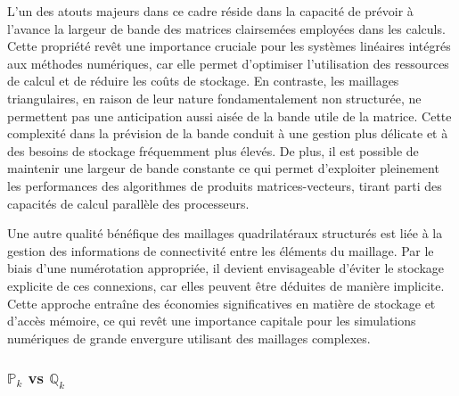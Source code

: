 L'un des atouts majeurs dans ce cadre réside dans la capacité de prévoir à l'avance la largeur de bande des matrices clairsemées employées dans les calculs. Cette propriété revêt une importance cruciale pour les systèmes linéaires intégrés aux méthodes numériques, car elle permet d'optimiser l'utilisation des ressources de calcul et de réduire les coûts de stockage. En contraste, les maillages triangulaires, en raison de leur nature fondamentalement non structurée, ne permettent pas une anticipation aussi aisée de la bande utile de la matrice. Cette complexité dans la prévision de la bande conduit à une gestion plus délicate et à des besoins de stockage fréquemment plus élevés. De plus, il est possible de maintenir une largeur de bande constante ce qui permet d'exploiter pleinement les performances des algorithmes de produits matrices-vecteurs, tirant parti des capacités de calcul parallèle des processeurs.

Une autre qualité bénéfique des maillages quadrilatéraux structurés est liée à la gestion des informations de connectivité entre les éléments du maillage. Par le biais d'une numérotation appropriée, il devient envisageable d'éviter le stockage explicite de ces connexions, car elles peuvent être déduites de manière implicite. Cette approche entraîne des économies significatives en matière de stockage et d'accès mémoire, ce qui revêt une importance capitale pour les simulations numériques de grande envergure utilisant des maillages complexes.


\subsubsection{$\mathbb{P}_k$ vs $\mathbb{Q}_k$}

